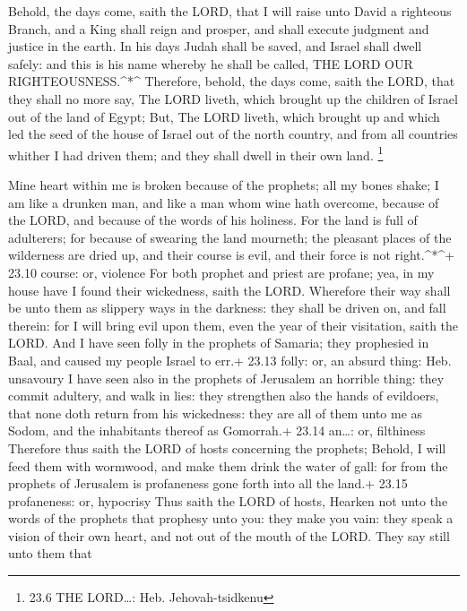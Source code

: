  Behold, the days come, saith the LORD, that I will raise
unto David a righteous Branch, and a King shall reign and prosper, and
shall execute judgment and justice in the earth.  In his
days Judah shall be saved, and Israel shall dwell safely: and this is
his name whereby he shall be called, THE LORD OUR
RIGHTEOUSNESS.\^{}*\^{}  Therefore, behold, the days come,
saith the LORD, that they shall no more say, The LORD liveth, which
brought up the children of Israel out of the land of Egypt; 
But, The LORD liveth, which brought up and which led the seed of the
house of Israel out of the north country, and from all countries whither
I had driven them; and they shall dwell in their own land. \footnote{23.6
  THE LORD\ldots: Heb. Jehovah-tsidkenu}

 Mine heart within me is broken because of the prophets; all
my bones shake; I am like a drunken man, and like a man whom wine hath
overcome, because of the LORD, and because of the words of his holiness.
 For the land is full of adulterers; for because of
swearing the land mourneth; the pleasant places of the wilderness are
dried up, and their course is evil, and their force is not
right.\^{}*\^{}+ 23.10 course: or, violence  For both
prophet and priest are profane; yea, in my house have I found their
wickedness, saith the LORD.  Wherefore their way shall be
unto them as slippery ways in the darkness: they shall be driven on, and
fall therein: for I will bring evil upon them, even the year of their
visitation, saith the LORD.  And I have seen folly in the
prophets of Samaria; they prophesied in Baal, and caused my people
Israel to err.+ 23.13 folly: or, an absurd thing: Heb. unsavoury
 I have seen also in the prophets of Jerusalem an horrible
thing: they commit adultery, and walk in lies: they strengthen also the
hands of evildoers, that none doth return from his wickedness: they are
all of them unto me as Sodom, and the inhabitants thereof as Gomorrah.+
23.14 an\ldots: or, filthiness  Therefore thus saith the
LORD of hosts concerning the prophets; Behold, I will feed them with
wormwood, and make them drink the water of gall: for from the prophets
of Jerusalem is profaneness gone forth into all the land.+ 23.15
profaneness: or, hypocrisy  Thus saith the LORD of hosts,
Hearken not unto the words of the prophets that prophesy unto you: they
make you vain: they speak a vision of their own heart, and not out of
the mouth of the LORD.  They say still unto them that
